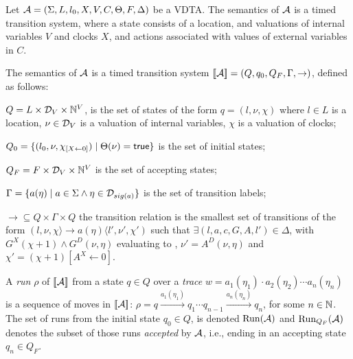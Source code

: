 Let ${\mathcal A} = \left(\Sigma, L, {l_0}, X, V, C, \Theta, F,  \Delta \right)$  be a VDTA.
The semantics of ${\mathcal A}$ is a timed transition system,
where a state consists of a location, and valuations of internal variables $V$ and clocks $X$, and actions associated with values of external variables in $C$.

\begin{definition}
	\label{def:vdta:semantics}
	The semantics of ${\mathcal A}$ is a timed transition system $[\![{\mathcal A}]\!]=( Q, q_0, Q_F, \Gamma, \to )$, defined as follows:
	\squishlist
	\item $Q = L \times {\cal D}_V \times \mathbb{N}^V$, is the set of states of the form $q= ( l,\nu ,\chi )$ where
	$l \in L$ is a location,
	$\nu \in {\cal D}_V$ is a valuation of internal variables,
	$\chi$ is a valuation of clocks;
	\item $Q_0 = \{ ( l_0,\nu, \chi_{[X \leftarrow 0]} )  \mid \Theta(\nu)=\mathsf{true} \}$ is the set of initial states;
	\item $Q_F = F \times {\cal D}_V \times \mathbb{N}^V$ is the set of accepting states;
	\item $\Gamma = \{ a(\eta) \mid
	a \in \Sigma \wedge \eta \in {\cal D}_{sig(a)}  \}$ is the set of transition labels;
	\item $\to\subseteq Q\times \Gamma\times Q$  the transition relation
	is the smallest set of transitions of the form
	$( l,\nu,\chi \rangle \longrightarrow {a(\eta)} \langle l',\nu',\chi')$
	such that  $\exists ( l, a, c, G, A, l' ) \in \Delta$,
	with $G^X(\chi + 1) \wedge G^D(\nu, \eta) $ evaluating to {\true},
	$\nu'= A^D(\nu, \eta)$ and $\chi'=(\chi+1)[A^X \leftarrow 0]$.
	\squishend
\end{definition}


A {\em run} $\rho$ of $[\![{\mathcal A}]\!]$ from a state $q\in Q$ over a {\em trace} $w =  a_1(\eta_1)\cdot a_2(\eta_2)\cdots a_n(\eta_n)$ is a sequence of moves in $[\![{\mathcal A}]\!]$:
$\rho = q \xrightarrow {a_1(\eta_1)} q_1
\cdots q_{n-1}\xrightarrow {a_n(\eta_n)} q_{n}$,
for some $n\in\mathbb{N}$.
The set of runs from the initial state $q_0\in Q$,  is denoted $\operatorname{Run}({\mathcal A})$ and $\operatorname{Run}_{Q_F}({\mathcal A})$ denotes the subset of those runs {\em accepted} by ${\mathcal A}$, i.e.,  ending in an accepting state $q_n \in Q_F$.

